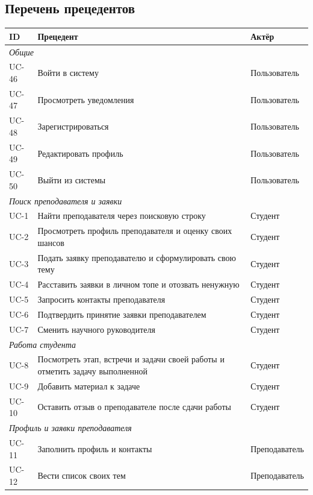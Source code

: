 \documentclass[a4paper,12pt]{article}
\begin{document}
\subsection{Перечень прецедентов}
\begin{center}
\small
\begin{longtable}{|l|p{9.6cm}|p{2.9cm}|}
\hline
\textbf{ID} & \textbf{Прецедент} & \textbf{Актёр}\\ \hline
\endhead
\multicolumn{3}{|l|}{\textit{Общие}}\\ \hline
UC-46 & Войти в систему & Пользователь\\ \hline
UC-47 & Просмотреть уведомления & Пользователь\\ \hline
UC-48 & Зарегистрироваться & Пользователь\\ \hline
UC-49 & Редактировать профиль & Пользователь\\ \hline
UC-50 & Выйти из системы & Пользователь\\ \hline
\multicolumn{3}{|l|}{\textit{Поиск преподавателя и заявки}}\\ \hline
UC-1 & Найти преподавателя через поисковую строку & Студент\\ \hline
UC-2 & Просмотреть профиль преподавателя и оценку своих шансов & Студент\\ \hline
UC-3 & Подать заявку преподавателю и сформулировать свою тему & Студент\\ \hline
UC-4 & Расставить заявки в личном топе и отозвать ненужную & Студент\\ \hline
UC-5 & Запросить контакты преподавателя & Студент\\ \hline
UC-6 & Подтвердить принятие заявки преподавателем & Студент\\ \hline
UC-7 & Сменить научного руководителя & Студент\\ \hline
\multicolumn{3}{|l|}{\textit{Работа студента}}\\ \hline
UC-8 & Посмотреть этап, встречи и задачи своей работы и отметить задачу выполненной & Студент\\ \hline
UC-9 & Добавить материал к задаче & Студент\\ \hline
UC-10 & Оставить отзыв о преподавателе после сдачи работы & Студент\\ \hline
\multicolumn{3}{|l|}{\textit{Профиль и заявки преподавателя}}\\ \hline
UC-11 & Заполнить профиль и контакты & Преподаватель\\ \hline
UC-12 & Вести список своих тем & Преподаватель\\ \hline

\end{longtable}
\end{center}
\end{document}
